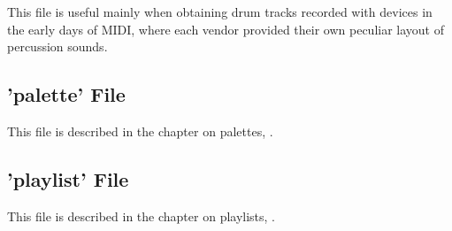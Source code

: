    This file is useful mainly when obtaining drum tracks recorded with devices in
   the early days of MIDI, where each vendor provided their own peculiar layout of
   percussion sounds.

\subsection{'palette' File}
\label{subsec:configuration_palette}

   This file is described in the chapter on palettes, .

\subsection{'playlist' File}
\label{subsec:configuration_playlist}

   This file is described in the chapter on playlists, .

